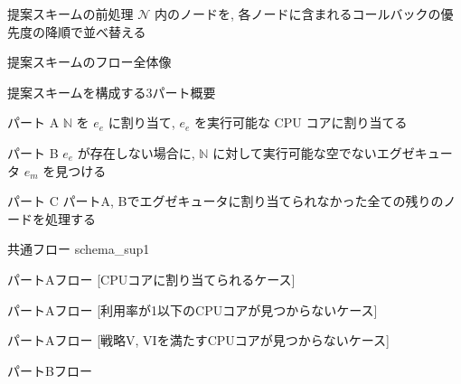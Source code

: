 \begin{frame}{提案スキームの前処理}
    $\mathcal{N}$ 内のノードを, 各ノードに含まれるコールバックの優先度の降順で並べ替える
\end{frame}

\begin{frame}{提案スキームのフロー全体像}
\end{frame}

\begin{frame}{提案スキームを構成する3パート概要}
    \begin{block}{パート A}
        $\mathbb{N}$ を $e_{e}$ に割り当て, $e_{e}$ を実行可能な CPU コアに割り当てる
    \end{block}
    \begin{block}{パート B}
        $e_{e}$ が存在しない場合に, $\mathbb{N}$ に対して実行可能な空でないエグゼキュータ $e_{m}$ を見つける
    \end{block}
    \begin{block}{パート C}
        パートA, Bでエグゼキュータに割り当てられなかった全ての残りのノードを処理する
    \end{block}
\end{frame}

\begin{frame}{共通フロー}
    {schema_sup1}
\end{frame}

\begin{frame}{パートAフロー [CPUコアに割り当てられるケース]}
\end{frame}

\begin{frame}{パートAフロー [利用率が1以下のCPUコアが見つからないケース]}
\end{frame}

\begin{frame}{パートAフロー [戦略V, VIを満たすCPUコアが見つからないケース]}
\end{frame}

\begin{frame}{パートBフロー}
\end{frame}

